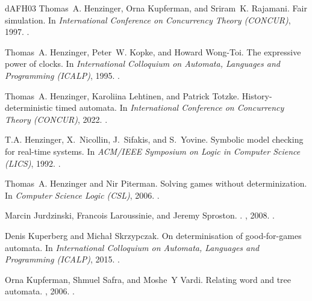 \documentclass[10pt,a4paper]{amsart}
\theoremstyle{definition}
\numberwithin{equation}{section}
\begin{document}
\begin{thebibliography}{dAFH{\etalchar{+}}03}
Thomas~A. Henzinger, Orna Kupferman, and Sriram~K. Rajamani.
\newblock Fair simulation.
\newblock In {\em International Conference on Concurrency Theory (CONCUR)},
  1997.
\newblock \href {https://doi.org/10.1007/3-540-63141-0_19}
  {}.

Thomas~A. Henzinger, Peter~W. Kopke, and Howard Wong{-}Toi.
\newblock The expressive power of clocks.
\newblock In {\em International Colloquium on Automata, Languages and
  Programming (ICALP)}, 1995.
\newblock \href {https://doi.org/10.1007/3-540-60084-1_93}
  {}.

Thomas~A. Henzinger, Karoliina Lehtinen, and Patrick Totzke.
\newblock History-deterministic timed automata.
\newblock In {\em International Conference on Concurrency Theory (CONCUR)},
  2022.
\newblock \href {https://doi.org/10.4230/LIPIcs.CONCUR.2022.14}
  {}.

T.A. Henzinger, X.~Nicollin, J.~Sifakis, and S.~Yovine.
\newblock Symbolic model checking for real-time systems.
\newblock In {\em ACM/IEEE Symposium on Logic in Computer Science (LICS)},
  1992.
\newblock \href {https://doi.org/10.1109/LICS.1992.185551}
  {}.

Thomas~A. Henzinger and Nir Piterman.
\newblock Solving games without determinization.
\newblock In {\em Computer Science Logic (CSL)}, 2006.
\newblock \href {https://doi.org/10.1007/11874683_26}
  {}.

Marcin Jurdzinski, Francois Laroussinie, and Jeremy Sproston.
.
, 2008.
\newblock \href {https://doi.org/10.2168/LMCS-4(3:12)2008}
  {}.

Denis Kuperberg and Micha{\l} Skrzypczak.
\newblock On determinisation of good-for-games automata.
\newblock In {\em International Colloquium on Automata, Languages and
  Programming (ICALP)}, 2015.
\newblock \href {https://doi.org/10.1007/978-3-662-47666-6_24}
  {}.

Orna Kupferman, Shmuel Safra, and Moshe~Y Vardi.
\newblock Relating word and tree automata.
, 2006.
\newblock \href {https://doi.org/10.1016/j.apal.2005.06.009}
  {}.


\end{thebibliography}
\end{document}

